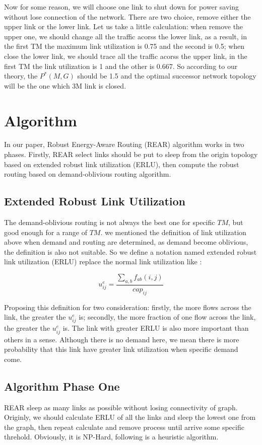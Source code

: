 \documentclass[conference]{IEEEtran}
\begin{document}
Now for some reason, we will choose one link to shut down for power saving without lose connection of the network.
There are two choice, remove either the upper link or the lower link. Let us take a little calculation: when
remove the upper one, we should change all the traffic acorss the lower link, as a result, in the first
TM the maximum link utilization is 0.75 and the second is 0.5; when close the lower link, we should trace all the
traffic acorss the upper link, in the first TM the link utilization is 1 and the other is 0.667.
So according to our theory, the $P^{*}(M, G)$ should be 1.5 and the optimal successor network topology will be
the one which 3M link is closed.

\section{Algorithm}
In our paper, Robust Energy-Aware Routing (REAR) algorithm works in two phases. Firstly, REAR select links 
should be put to sleep from the origin topology based on extended robust link utilization (ERLU), 
then compute the robust routing based on demand-oblivious routing algorithm.

\subsection{Extended Robust Link Utilization}
The demand-oblivious routing is not always the best one for specific $TM$, but good enough for a range of $TM$. 
we mentioned the definition of link utilization above when demand and routing are determined, as demand become 
oblivious, the definition is also not suitable. So we define a notation named extended robust link utilization (ERLU) 
replace the normal link utilization like :

\begin{equation}
	u^e_{ij} = \frac {\sum_{a,b}f_{ab}(i,j)} {cap_{ij}}
\end{equation}


Proposing this definition for two consideration: firstly, the more flows across the link, the greater the $u^e_{ij}$ is;
secondly, the more fraction of one flow across the link, the greater the $u^e_{ij}$ is. The link with greater
ERLU is also more important than others in a sense. Although there is no demand here, we mean
there is more probability that this link have greater link utilization when specific demand come. 

\subsection{Algorithm Phase One}
REAR sleep as many links as possible without losing connectivity of graph. 
Originly,  we should calculate ERLU of all the links and sleep the lowest one from the graph, then repeat calculate and remove
process until arrive some specific threhold. Obviously, it is NP-Hard, following is a heuristic algorithm.
\end{document}
